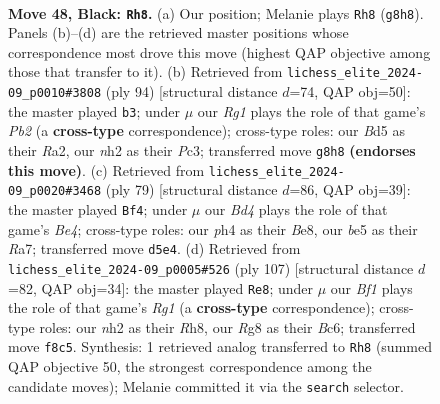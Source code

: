 \documentclass[11pt]{article}
\begin{document}
\clearpage

\begin{figure}[p]\centering
\begin{subfigure}{0.46\textwidth}\centering
\resizebox{\linewidth}{!}{%
\newchessgame
\chessboard[
  setfen={5br1/1r1k2p1/p1p5/Pp1bBp1p/2p4P/4PPP1/1P2K2N/R5R1 b - - 1 48},
  showmover=false,
  pgfstyle=straightmove, color=movearrow, markmove={g8-h8}
]}
\caption{}
\end{subfigure}\hfill
\begin{subfigure}{0.46\textwidth}\centering
\resizebox{\linewidth}{!}{%
\newchessgame
\chessboard[
  setfen={1r6/4kpp1/1r1p4/1bpBpPp1/p3P1P1/2PP2KP/RP6/1R6 w - - 21 48},
  showmover=false,
  pgfstyle=straightmove, color=movearrow, markmove={b2-b3}
]}
\caption{}
\end{subfigure}
\\[4pt]
\begin{subfigure}{0.46\textwidth}\centering
\resizebox{\linewidth}{!}{%
\newchessgame
\chessboard[
  setfen={2r1b3/rp3p2/5k2/P2Pbp2/1p5p/1N3PpP/RP1R2P1/5B1K b - - 11 40},
  showmover=false,
  pgfstyle=straightmove, color=movearrow, markmove={e5-f4}
]}
\caption{}
\end{subfigure}\hfill
\begin{subfigure}{0.46\textwidth}\centering
\resizebox{\linewidth}{!}{%
\newchessgame
\chessboard[
  setfen={6rr/5p2/1kb1p1p1/1p1pP2p/pP3P2/P1P1R1P1/4B2P/2KR4 b - - 48 54},
  showmover=false,
  pgfstyle=straightmove, color=movearrow, markmove={g8-e8}
]}
\caption{}
\end{subfigure}
\caption{\textbf{Move 48, Black: \texttt{Rh8}.} (a) Our position; Melanie plays \texttt{Rh8} (\texttt{g8h8}). Panels (b)--(d) are the retrieved master positions whose correspondence most drove this move (highest QAP objective among those that transfer to it). (b) Retrieved from \texttt{lichess\_elite\_2024-09\_p0010\#3808} (ply 94) [structural distance $d$=74, QAP obj=50]: the master played \texttt{b3}; under $\mu$ our \emph{Rg1} plays the role of that game's \emph{Pb2} (a \textbf{cross-type} correspondence); cross-type roles: our \emph{B}d5 as their \emph{R}a2, our \emph{n}h2 as their \emph{P}c3; transferred move \texttt{g8h8} \textbf{(endorses this move)}. (c) Retrieved from \texttt{lichess\_elite\_2024-09\_p0020\#3468} (ply 79) [structural distance $d$=86, QAP obj=39]: the master played \texttt{Bf4}; under $\mu$ our \emph{Bd4} plays the role of that game's \emph{Be4}; cross-type roles: our \emph{p}h4 as their \emph{B}e8, our \emph{b}e5 as their \emph{R}a7; transferred move \texttt{d5e4}. (d) Retrieved from \texttt{lichess\_elite\_2024-09\_p0005\#526} (ply 107) [structural distance $d$=82, QAP obj=34]: the master played \texttt{Re8}; under $\mu$ our \emph{Bf1} plays the role of that game's \emph{Rg1} (a \textbf{cross-type} correspondence); cross-type roles: our \emph{n}h2 as their \emph{R}h8, our \emph{R}g8 as their \emph{B}c6; transferred move \texttt{f8c5}. Synthesis: 1 retrieved analog transferred to \texttt{Rh8} (summed QAP objective 50, the strongest correspondence among the candidate moves); Melanie committed it via the \texttt{search} selector.}
\label{fig:thought-m95}
\end{figure}
\end{document}
